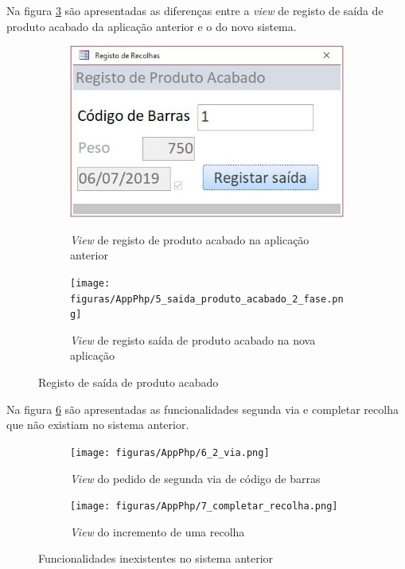Na figura \ref{fig:comparacao_prodacabado_saida} são apresentadas as diferenças entre a \textit{view} de registo de saída de produto acabado da aplicação anterior e o do novo sistema.
\begin{figure}[H]
	\centering
	
	\begin{subfigure}[t]{0.45\linewidth}
		\includegraphics[width=\linewidth]{figuras/AppAccess/5-SaidaProdutoAcabado.jpg}
		\label{fig:comparacao_prodacabado_saida_1}
		\caption{\textit{View} de registo de produto acabado na aplicação anterior}
	\end{subfigure}
	\begin{subfigure}[t]{0.45\linewidth}
		\texttt{[image: figuras/AppPhp/5\_saida\_produto\_acabado\_2\_fase.png]}
		\label{fig:comparacao_prodacabado_saida_2}
		\caption{\textit{View} de registo saída de produto acabado na nova aplicação}
	\end{subfigure}
	
	\caption{Registo de saída de produto acabado}
	\label{fig:comparacao_prodacabado_saida}
\end{figure}

Na figura \ref{fig:comparacao_novasfunc} são apresentadas as funcionalidades segunda via e completar recolha que não existiam no sistema anterior.
\begin{figure}[H]
	\centering
	
	\begin{subfigure}[t]{0.45\linewidth}
		\texttt{[image: figuras/AppPhp/6\_2\_via.png]}
		\label{fig:comparacao_novasfunc_1}
		\caption{\textit{View} do pedido de segunda via de código de barras}
	\end{subfigure}
	\begin{subfigure}[t]{0.45\linewidth}
		\texttt{[image: figuras/AppPhp/7\_completar\_recolha.png]}
		\label{fig:comparacao_novasfunc_2}
		\caption{\textit{View} do incremento de uma recolha}
	\end{subfigure}
	
	\caption{Funcionalidades inexistentes no sistema anterior}
	\label{fig:comparacao_novasfunc}
\end{figure}

